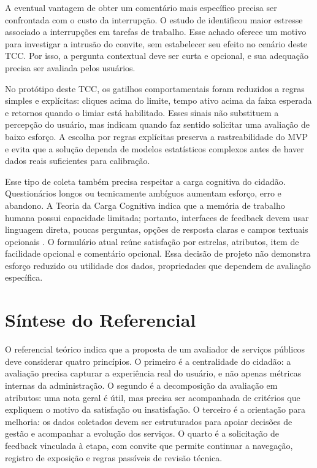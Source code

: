 A eventual vantagem de obter um comentário mais específico precisa ser confrontada com o custo da interrupção. O estudo de  identificou maior estresse associado a interrupções em tarefas de trabalho. Esse achado oferece um motivo para investigar a intrusão do convite, sem estabelecer seu efeito no cenário deste TCC. Por isso, a pergunta contextual deve ser curta e opcional, e sua adequação precisa ser avaliada pelos usuários.

No protótipo deste TCC, os gatilhos comportamentais foram reduzidos a regras simples e explícitas: cliques acima do limite, tempo ativo acima da faixa esperada e retornos quando o limiar está habilitado. Esses sinais não substituem a percepção do usuário, mas indicam quando faz sentido solicitar uma avaliação de baixo esforço. A escolha por regras explícitas preserva a rastreabilidade do MVP e evita que a solução dependa de modelos estatísticos complexos antes de haver dados reais suficientes para calibração.

Esse tipo de coleta também precisa respeitar a carga cognitiva do cidadão. Questionários longos ou tecnicamente ambíguos aumentam esforço, erro e abandono. A Teoria da Carga Cognitiva indica que a memória de trabalho humana possui capacidade limitada; portanto, interfaces de feedback devem usar linguagem direta, poucas perguntas, opções de resposta claras e campos textuais opcionais \cite{sweller1988}. O formulário atual reúne satisfação por estrelas, atributos, item de facilidade opcional e comentário opcional. Essa decisão de projeto não demonstra esforço reduzido ou utilidade dos dados, propriedades que dependem de avaliação específica.

\section{Síntese do Referencial}
\label{sec:2.11}

O referencial teórico indica que a proposta de um avaliador de serviços públicos deve considerar quatro princípios. O primeiro é a centralidade do cidadão: a avaliação precisa capturar a experiência real do usuário, e não apenas métricas internas da administração. O segundo é a decomposição da avaliação em atributos: uma nota geral é útil, mas precisa ser acompanhada de critérios que expliquem o motivo da satisfação ou insatisfação. O terceiro é a orientação para melhoria: os dados coletados devem ser estruturados para apoiar decisões de gestão e acompanhar a evolução dos serviços. O quarto é a solicitação de feedback vinculada à etapa, com convite que permite continuar a navegação, registro de exposição e regras passíveis de revisão técnica.

